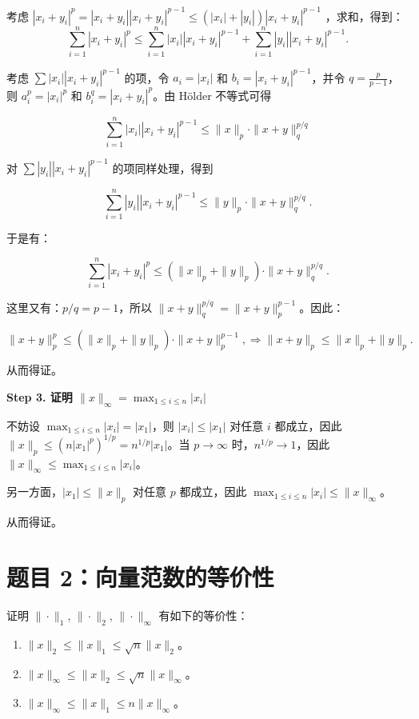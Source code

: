 \documentclass{article}
\begin{document}
\begin{solution}
  考虑 $|x_i + y_i|^p = |x_i + y_i| |x_i + y_i|^{p-1} \leq (|x_i| +
  |y_i|) |x_i + y_i|^{p-1}$ ，求和，得到：
  \[
    \sum_{i=1}^{n} |x_i + y_i|^p \leq \sum_{i=1}^{n} |x_i| |x_i + y_i|^{p-1} +
    \sum_{i=1}^{n} |y_i| |x_i + y_i|^{p-1}.
  \]

  考虑 $\sum |x_i||x_i+y_i|^{p-1}$ 的项，令 $a_i = |x_i|$ 和 $b_i = |x_i +
  y_i|^{p-1}$，并令 $q = \frac{p}{p-1}$，则 $a_i^p = |x_i|^p$ 和 $b_i^q =
  |x_i + y_i|^p$。由 H\"older 不等式可得

  \[
    \sum_{i=1}^{n} |x_i||x_i+y_i|^{p-1} \leq \|x\|_p \cdot \|x+y\|_q^{p/q}
  \]

  对 $\sum |y_i||x_i+y_i|^{p-1}$ 的项同样处理，得到

  \[
    \sum_{i=1}^{n} |y_i||x_i+y_i|^{p-1} \leq \|y\|_p \cdot \|x+y\|_q^{p/q}.
  \]

  于是有：

  \[
    \sum_{i=1}^{n} |x_i + y_i|^p \leq (\|x\|_p + \|y\|_p) \cdot \|x+y\|_q^{p/q}.
  \]

  这里又有：$p/q = p - 1$，所以 $\|x+y\|_q^{p/q} = \|x+y\|_p^{p-1}$。因此：

  \[
    \|x+y\|_p^p \leq (\|x\|_p + \|y\|_p) \cdot \|x+y\|_p^{p-1},
    \Rightarrow \|x+y\|_p \leq \|x\|_p + \|y\|_p.
  \]

  从而得证。

  \textbf{Step 3. 证明 $\|x\|_\infty = \max_{1 \leq i \leq n} |x_i|$}

  不妨设 $\max_{1 \leq i \leq n} |x_i| = |x_1|$，则 $|x_i| \leq |x_1|$ 对任意
  $i$ 都成立，因此 $\|x\|_p \leq (n |x_1|^p)^{1/p} = n^{1/p} |x_1|$。当 $p
  \to \infty$ 时，$n^{1/p} \to 1$，因此 $\|x\|_\infty \leq \max_{1 \leq i
  \leq n} |x_i|$。

  另一方面，$|x_1| \leq \|x\|_p$ 对任意 $p$ 都成立，因此 $\max_{1 \leq i \leq n}
  |x_i| \leq \|x\|_\infty$。

  从而得证。

\end{solution}

\section{题目 2：向量范数的等价性}

证明 $\|\cdot\|_1$, $\|\cdot\|_2$, $\|\cdot\|_\infty$ 有如下的等价性：
\begin{enumerate}
  \item $\|x\|_2 \leq \|x\|_1 \leq \sqrt{n}\|x\|_2$。
  \item $\|x\|_\infty \leq \|x\|_2 \leq \sqrt{n}\|x\|_\infty$。
  \item $\|x\|_\infty \leq \|x\|_1 \leq n\|x\|_\infty$。
\end{enumerate}
\end{document}
